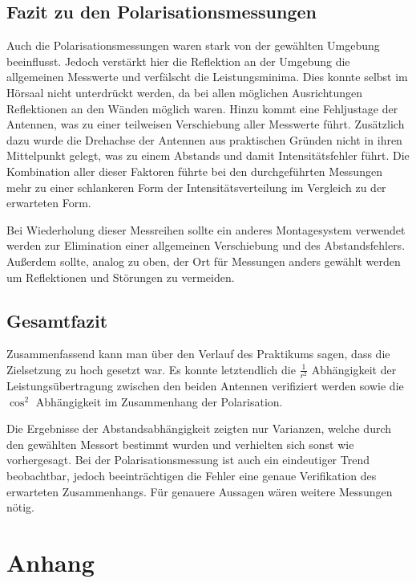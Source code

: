 \documentclass[titlepage,11pt,a4paper,ngerman]{article}
\begin{document}
\subsection{Fazit zu den Polarisationsmessungen}
Auch die Polarisationsmessungen waren stark von der gewählten Umgebung beeinflusst. Jedoch verstärkt hier die Reflektion an der Umgebung die allgemeinen Messwerte und verfälscht die Leistungsminima. Dies konnte selbst im Hörsaal nicht unterdrückt werden, da bei allen möglichen Ausrichtungen Reflektionen an den Wänden möglich waren.  Hinzu kommt eine Fehljustage der Antennen, was zu einer teilweisen Verschiebung aller Messwerte führt. Zusätzlich dazu wurde die Drehachse der Antennen aus praktischen Gründen nicht in ihren Mittelpunkt gelegt, was zu einem Abstands und damit Intensitätsfehler führt. Die Kombination aller dieser Faktoren führte bei den durchgeführten Messungen mehr zu einer schlankeren Form der Intensitätsverteilung im Vergleich zu der erwarteten Form. \par
Bei Wiederholung dieser Messreihen sollte ein anderes Montagesystem verwendet werden zur Elimination einer allgemeinen Verschiebung und des Abstandsfehlers. Außerdem sollte, analog zu oben, der Ort für Messungen anders gewählt werden um Reflektionen und Störungen zu vermeiden.

\subsection{Gesamtfazit}
Zusammenfassend kann man über den Verlauf des Praktikums sagen, dass die Zielsetzung zu hoch gesetzt war. Es konnte letztendlich die $\frac{1}{r^2}$ Abhängigkeit der Leistungsübertragung zwischen den beiden Antennen verifiziert werden sowie die $\cos^2$ Abhängigkeit im Zusammenhang der Polarisation. \par 
Die Ergebnisse der Abstandsabhängigkeit zeigten nur Varianzen, welche durch den gewählten Messort bestimmt wurden und verhielten sich sonst wie vorhergesagt. Bei der Polarisationsmessung ist auch ein eindeutiger Trend beobachtbar, jedoch beeinträchtigen die Fehler eine genaue Verifikation des erwarteten Zusammenhangs. Für genauere Aussagen wären weitere Messungen nötig.






\pagebreak

\section*{Anhang}
\end{document}
